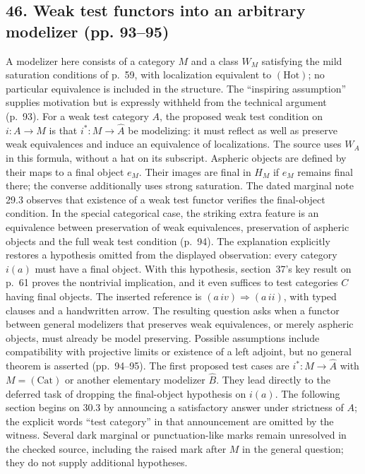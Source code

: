 \subsection*{46. Weak test functors into an arbitrary modelizer (pp. 93--95)}
A modelizer here consists of a category $M$ and a class $W_M$ satisfying the mild saturation conditions of p.~59, with localization equivalent to $(\mathrm{Hot})$; no particular equivalence is included in the structure. The ``inspiring assumption'' supplies motivation but is expressly withheld from the technical argument (p.~93). For a weak test category $A$, the proposed weak test condition on $i:A\to M$ is that $i^*:M\to\widehat A$ be modelizing: it must reflect as well as preserve weak equivalences and induce an equivalence of localizations. The source uses $W_A$ in this formula, without a hat on its subscript. Aspheric objects are defined by their maps to a final object $e_M$. Their images are final in $H_M$ if $e_M$ remains final there; the converse additionally uses strong saturation. The dated marginal note 29.3 observes that existence of a weak test functor verifies the final-object condition. In the special categorical case, the striking extra feature is an equivalence between preservation of weak equivalences, preservation of aspheric objects and the full weak test condition (p.~94). The explanation explicitly restores a hypothesis omitted from the displayed observation: every category $i(a)$ must have a final object. With this hypothesis, section~37's key result on p.~61 proves the nontrivial implication, and it even suffices to test categories $C$ having final objects. The inserted reference is $(a\,iv)\Rightarrow(a\,ii)$, with typed clauses and a handwritten arrow. The resulting question asks when a functor between general modelizers that preserves weak equivalences, or merely aspheric objects, must already be model preserving. Possible assumptions include compatibility with projective limits or existence of a left adjoint, but no general theorem is asserted (pp.~94--95). The first proposed test cases are $i^*:M\to\widehat A$ with $M=(\mathrm{Cat})$ or another elementary modelizer $\widehat B$. They lead directly to the deferred task of dropping the final-object hypothesis on $i(a)$. The following section begins on 30.3 by announcing a satisfactory answer under strictness of $A$; the explicit words ``test category'' in that announcement are omitted by the witness. Several dark marginal or punctuation-like marks remain unresolved in the checked source, including the raised mark after $M$ in the general question; they do not supply additional hypotheses.

